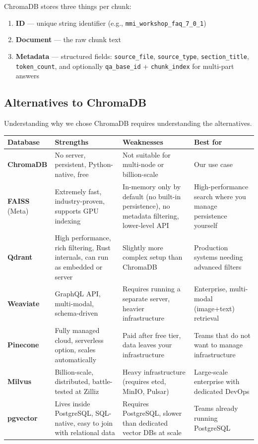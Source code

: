 \documentclass[12pt,letterpaper]{article}
\begin{document}
ChromaDB stores three things per chunk:
\begin{enumerate}[leftmargin=2em]
  \item \textbf{ID} — unique string identifier (e.g., \texttt{mmi\_workshop\_faq\_7\_0\_1})
  \item \textbf{Document} — the raw chunk text
  \item \textbf{Metadata} — structured fields: \texttt{source\_file},
        \texttt{source\_type}, \texttt{section\_title}, \texttt{token\_count},
        and optionally \texttt{qa\_base\_id} + \texttt{chunk\_index} for
        multi-part answers
\end{enumerate}

\subsection{Alternatives to ChromaDB}

Understanding why we chose ChromaDB requires understanding the alternatives.

\begin{center}
\begin{longtable}{p{2.5cm}p{4cm}p{4cm}p{2.5cm}}
\toprule
\textbf{Database} & \textbf{Strengths} & \textbf{Weaknesses} & \textbf{Best for} \\
\midrule
\textbf{ChromaDB}
  & No server, persistent, Python-native, free
  & Not suitable for multi-node or billion-scale
  & Our use case \\
\midrule
\textbf{FAISS} (Meta)
  & Extremely fast, industry-proven, supports GPU indexing
  & In-memory only by default (no built-in persistence), no metadata filtering, lower-level API
  & High-performance search where you manage persistence yourself \\
\midrule
\textbf{Qdrant}
  & High performance, rich filtering, Rust internals, can run as embedded or server
  & Slightly more complex setup than ChromaDB
  & Production systems needing advanced filters \\
\midrule
\textbf{Weaviate}
  & GraphQL API, multi-modal, schema-driven
  & Requires running a separate server, heavier infrastructure
  & Enterprise, multi-modal (image+text) retrieval \\
\midrule
\textbf{Pinecone}
  & Fully managed cloud, serverless option, scales automatically
  & Paid after free tier, data leaves your infrastructure
  & Teams that do not want to manage infrastructure \\
\midrule
\textbf{Milvus}
  & Billion-scale, distributed, battle-tested at Zilliz
  & Heavy infrastructure (requires etcd, MinIO, Pulsar)
  & Large-scale enterprise with dedicated DevOps \\
\midrule
\textbf{pgvector}
  & Lives inside PostgreSQL, SQL-native, easy to join with relational data
  & Requires PostgreSQL, slower than dedicated vector DBs at scale
  & Teams already running PostgreSQL \\
\bottomrule
\end{longtable}
\end{center}
\end{document}
